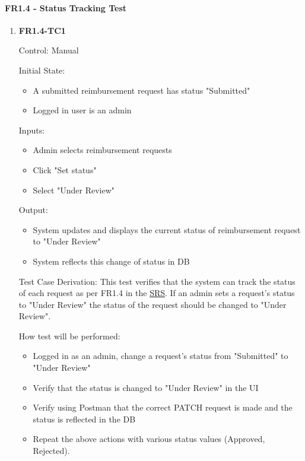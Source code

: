 \documentclass[12pt, titlepage]{article}
\begin{document}
\paragraph{FR1.4 - Status Tracking Test}

\begin{enumerate}
    \item{\textbf{FR1.4-TC1}}
    
    Control: Manual
    
    Initial State:
    \begin{itemize}
        \item A submitted reimbursement request has status "Submitted"
        \item Logged in user is an admin
    \end{itemize}
    
    Inputs: 
    \begin{itemize}
        \item Admin selects reimbursement requests
        \item Click "Set status"
        \item Select "Under Review"
    \end{itemize}
    
    Output: 
    \begin{itemize}
        \item System updates and displays the current status of reimbursement request to "Under Review"
        \item System reflects this change of status in DB
    \end{itemize}
    
    Test Case Derivation: This test verifies that the system can track the status of each request as per FR1.4 in the \href{https://shorturl.at/FdAgR}{SRS}. If an admin sets a request's status to "Under Review" the status of the request should be changed to "Under Review".
    
    How test will be performed:
    \begin{itemize}
        \item Logged in as an admin, change a request's status from "Submitted" to "Under Review"
        \item Verify that the status is changed to "Under Review" in the UI
        \item Verify using Postman that the correct PATCH request is made and the status is reflected in the DB
        \item Repeat the above actions with various status values (Approved, Rejected).
    \end{itemize}
\end{enumerate}
\end{document}
